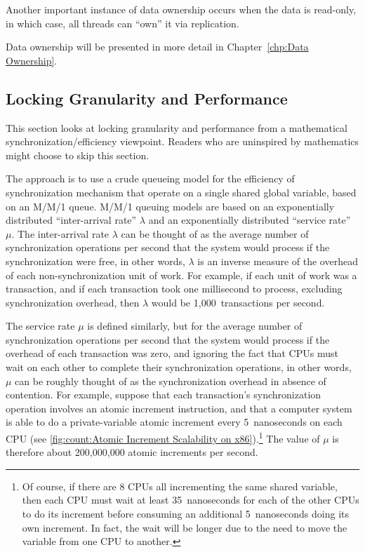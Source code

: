 Another important instance of data ownership occurs when the data
is read-only, in which case,
all threads can ``own'' it via replication.

Data ownership will be presented in more detail in
Chapter~\ref{chp:Data Ownership}.

\subsection{Locking Granularity and Performance}
\label{sec:SMPdesign:Locking Granularity and Performance}

This section looks at locking granularity and performance from
a mathematical synchronization\-/efficiency viewpoint.
Readers who are uninspired by mathematics might choose to skip
this section.

The approach is to use a crude queueing model for the efficiency of
synchronization mechanism that operate on a single shared global
variable, based on an M/M/1 queue.
M/M/1 queuing models are based on an exponentially distributed
``inter-arrival rate'' $\lambda$ and an exponentially distributed
``service rate'' $\mu$.
The inter-arrival rate $\lambda$ can be thought of as the average
number of synchronization operations per second that the system
would process if the synchronization were free, in other words,
$\lambda$ is an inverse measure of the overhead of each non-synchronization
unit of work.
For example, if each unit of work was a transaction, and if each transaction
took one millisecond to process, excluding synchronization overhead,
then $\lambda$ would be 1,000~transactions per second.

The service rate $\mu$ is defined similarly, but for the average
number of synchronization operations per second that the system
would process if the overhead of each transaction was zero, and
ignoring the fact that CPUs must wait on each other to complete
their synchronization operations, in other words, $\mu$ can be roughly
thought of as the synchronization overhead in absence of contention.
For example, suppose that each transaction's synchronization operation
involves an atomic increment instruction, and that a computer system is
able to do a private-variable atomic increment every 5~nanoseconds on
each CPU
(see \cref{fig:count:Atomic Increment Scalability on x86}).\footnote{
	Of course, if there are 8 CPUs all incrementing the same
	shared variable, then each CPU must wait at least 35~nanoseconds
	for each of the other CPUs to do its increment before consuming
	an additional 5~nanoseconds doing its own increment.
	In fact, the wait will be longer due to the need
	to move the variable from one CPU to another.}
The value of $\mu$ is therefore about 200,000,000 atomic increments
per second.

